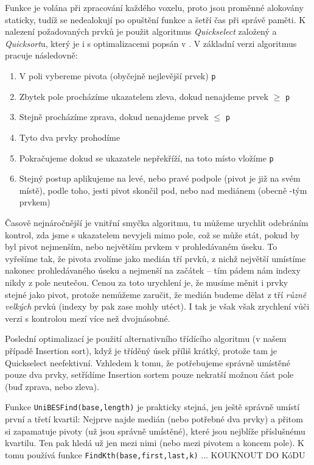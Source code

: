         Funkce je volána při zpracování každého voxelu, proto jsou proměnné alokovány staticky, tudíž se nedealokují po opuštění funkce a šetří čas při správě paměti. K nalezení požadovaných prvků je použit algoritmus \emph{Quickselect} založený a \emph{Quicksort}u, který je i s optimalizacemi popsán v \cite{Numerical Recipes}. V základní verzi algoritmus pracuje následovně:
        \begin{enumerate}
          \item V poli vybereme pivota (obyčejně nejlevější prvek) {\tt p}
          \item Zbytek pole procházíme ukazatelem zleva, dokud nenajdeme prvek $\ge$ {\tt p}
          \item Stejně procházíme zprava, dokud nenajdeme prvek $\le$ {\tt p}
          \item Tyto dva prvky prohodíme
          \item Pokračujeme dokud se ukazatele nepřekříží, na toto místo vložíme {\tt p}
          \item Stejný postup aplikujeme na levé, nebo pravé podpole (pivot je již na svém místě), podle toho, jesti pivot skončil pod, nebo nad mediánem (obecně \kk-tým prvkem)
        \end{enumerate}

        Časově nejnáročnější je vnitřní smyčka algoritmu, tu můžeme urychlit odebráním kontrol, zda jsme s ukazatelem nevyjeli mimo pole, což se může stát, pokud by byl pivot nejmenším, nebo největším prvkem v prohledávaném úseku. To vyřešíme tak, že pivota zvolíme jako medián tří prvků, z nichž největší umístíme nakonec prohledávaného úseku a nejmenší na začátek -- tím pádem nám indexy nikdy z pole neutečou. Cenou za toto urychlení je, že musíme měnit i prvky stejné jako pivot, protože nemůžeme zaručit, že medián budeme dělat z tří \emph{různě velkých} prvků (indexy by pak zase mohly utéct). I tak je však však zrychlení vůči verzi s kontrolou mezí více než dvojnásobné.

        Poslední optimalizací je použití alternativního třídícího algoritmu (v našem případě Insertion sort), když je tříděný úsek příliš krátký, protože tam je Quickselect neefektivní. Vzhledem k tomu, že potřebujeme správně umístěné pouze dva prvky, setřídíme Insertion sortem pouze nekratší možnou část pole (buď zprava, nebo zleva).

        Funkce {\tt UniBESFind(base,length)} je prakticky stejná, jen ještě správně umístí první a třetí kvartil: Nejprve najde medián (nebo potřebné dva prvky) a přitom si zapamatuje pivoty (už jsou správně umístěné), které jsou nejblíže příslušnému kvartilu. Ten pak hledá už jen mezi nimi (nebo mezi pivotem a koncem pole). K tomu používá funkce {\tt FindKth(base,first,last,k)} ... KOUKNOUT DO KóDU


























